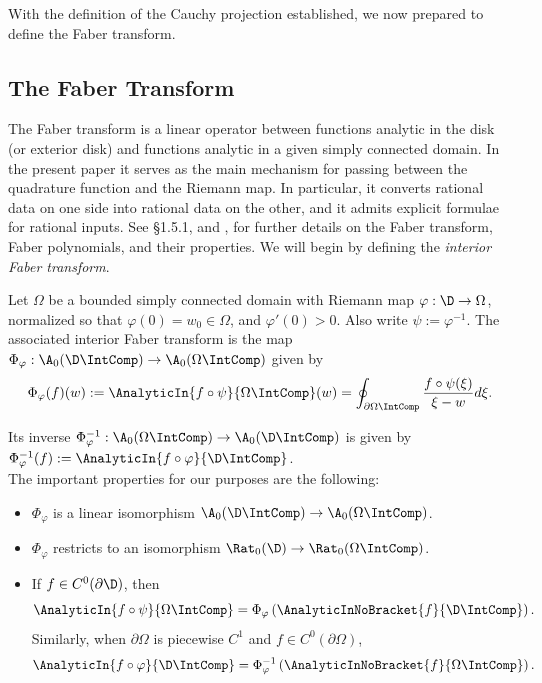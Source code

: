 \documentclass{article}
\numberwithin{equation}{section}
\begin{document}
With the definition of the Cauchy projection established, we now prepared to define the Faber transform.


\subsection{The Faber Transform}\label{subsec:FaberTransform}
The Faber transform is a linear operator between functions analytic in the disk (or exterior disk) and functions analytic in a given simply connected domain. In the present paper it serves as the main mechanism for passing between the quadrature function and the Riemann map. In particular, it converts rational data on one side into rational data on the other, and it admits explicit formulae for rational inputs. See \cite{GravenMakarov2025} \S1.5.1, and \cite{FaberTransformRationalApprox1983,FaberTransformAnalyticContinuation1988,TheFaberOperator1984}, for further details on the Faber transform, Faber polynomials, and their properties. We will begin by defining the \emph{interior Faber transform}.

\begin{definition}
Let $\Omega$ be a bounded simply connected domain with Riemann map $\varphi:\D\rightarrow\Omega$, normalized so that $\varphi(0)=w_0\in\Omega$, and $\varphi'(0)>0$. Also write $\psi:=\varphi^{-1}$. The associated interior Faber transform is the map $\Phi_{\varphi}:\A_0(\D\IntComp)\rightarrow\A_0(\Omega\IntComp)$ given by
\begin{equation}\label{eqn:InteriorTransformFormula}
\Phi_{\varphi}(f)(w):=\AnalyticIn{f\circ\psi}{\Omega\IntComp}(w)=\oint_{\partial\Omega\IntComp}\dfrac{f\circ\psi(\xi)}{\xi-w}d\xi.
\end{equation}
\end{definition}
\noindent Its inverse $\Phi_{\varphi}^{-1}:\A_0(\Omega\IntComp)\rightarrow \A_0(\D\IntComp)$ is given by $\Phi_{\varphi}^{-1}(f):=\AnalyticIn{f\circ\varphi}{\D\IntComp}$.\\

\noindent The important properties for our purposes are the following:
\begin{itemize}
    \item $\Phi_{\varphi}$ is a linear isomorphism $\A_0(\D\IntComp)\rightarrow\A_0(\Omega\IntComp)$.
    \item $\Phi_{\varphi}$ restricts to an isomorphism $\Rat_0(\D)\rightarrow\Rat_{0}(\Omega\IntComp)$.
    \item If $f\in C^0(\partial\D)$, then
    \begin{equation}\label{eqn:InteriorFaberTransformProjectionExtension}
        \AnalyticIn{f\circ\psi}{\Omega\IntComp}=\Phi_\varphi\left(\AnalyticInNoBracket{f}{\D\IntComp}\right).
    \end{equation}
    Similarly, when $\partial\Omega$ is piecewise $C^1$ and $f\in C^0(\partial\Omega)$,
    \begin{equation}\label{eqn:InteriorInverseFaberTransformProjectionExtension}
        \AnalyticIn{f\circ\varphi}{\D\IntComp}=\Phi_{\varphi}^{-1}\left(\AnalyticInNoBracket{f}{\Omega\IntComp}\right).
    \end{equation}
\end{itemize}
\end{document}
